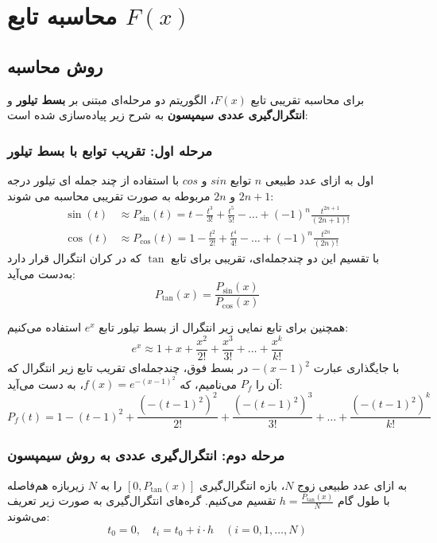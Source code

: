 \documentclass[12pt,a4paper]{article}
\begin{document}
\section{محاسبه تابع $F(x)$}

\subsection{روش محاسبه}
برای محاسبه تقریبی تابع $F(x)$، الگوریتم دو مرحله‌ای مبتنی بر \textbf{بسط تیلور} و \textbf{انتگرال‌گیری عددی سیمپسون} به شرح زیر پیاده‌سازی شده است:

\subsubsection{مرحله اول: تقریب توابع با بسط تیلور}
اول به ازای عدد طبیعی  $n$ توابع $sin$  و $cos$ با استفاده از چند جمله ای تیلور درجه $2n+1$  و $2n$ مربوطه به صورت تقریبی محاسبه می شوند:
\begin{align*}
\sin(t) &\approx P_{\sin}(t) = t - \frac{t^3}{3!} + \frac{t^5}{5!} - \dots + (-1)^n \frac{t^{2n+1}}{(2n+1)!} \\
\cos(t) &\approx P_{\cos}(t) = 1 - \frac{t^2}{2!} + \frac{t^4}{4!} - \dots + (-1)^n \frac{t^{2n}}{(2n)!}
\end{align*}
با تقسیم این دو چندجمله‌ای، تقریبی برای تابع $\tan$ که در کران انتگرال قرار دارد به‌دست می‌آید:
\begin{equation*}
P_{\tan}(x) = \frac{P_{\sin}(x)}{P_{\cos}(x)}
\end{equation*}

همچنین برای تابع نمایی زیر انتگرال از بسط تیلور تابع $e^x$ استفاده می‌کنیم:
\begin{equation*}
e^x \approx 1 + x + \frac{x^2}{2!} + \frac{x^3}{3!} + \dots + \frac{x^k}{k!}
\end{equation*}
با جایگذاری عبارت $-(x-1)^2$ در بسط فوق، چندجمله‌ای تقریب تابع زیر انتگرال که آن را $P_f$ می‌نامیم،  که $f(x) = e^{-(x-1)^2}$،   به دست می‌آید:
\begin{equation*}
P_f(t) = 1 - (t-1)^2 + \frac{(-(t-1)^2)^2}{2!} + \frac{(-(t-1)^2)^3}{3!} + \dots + \frac{(-(t-1)^2)^k}{k!}
\end{equation*}

\subsubsection{مرحله دوم: انتگرال‌گیری عددی به روش سیمپسون}
به ازای عدد طبیعی زوج $N$،  بازه انتگرال‌گیری $[0, P_{\tan}(x)]$ را به $N$ زیربازه هم‌فاصله با طول گام $h = \frac{P_{\tan}(x)}{N}$ تقسیم می‌کنیم. گره‌های انتگرال‌گیری به صورت زیر تعریف می‌شوند:
\begin{equation*}
t_0 = 0, \quad t_i = t_0 + i \cdot h \quad (i = 0, 1, \dots, N)
\end{equation*}
\end{document}
